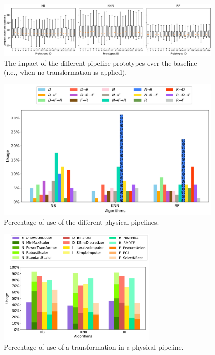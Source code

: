 \begin{figure}[!t]
	\centering
	\includegraphics[width=1.0\textwidth]{chapters/data-centric/supervised/img/prototypes_impact.pdf}
	\caption{The impact of the different pipeline prototypes over the baseline (i.e., when no transformation is applied).}
	\label{fig:prototypes-impact}
\end{figure}

\begin{figure}[!h]
	\centering
	\includegraphics[width=1.0\textwidth]{chapters/data-centric/supervised/img/pp_pipeline_study2.pdf}
	\caption{Percentage of use of the different physical pipelines.}
	\label{fig:pipeline-frequency}
\end{figure}

\begin{figure}[!h]
	\centering
	\includegraphics[width=0.7\textwidth]{chapters/data-centric/supervised/img/pp_pipeline_study_grouped.pdf}
	\caption{Percentage of use of a transformation in a physical pipeline.}
	\label{fig:transformation-frequency}
\end{figure}

